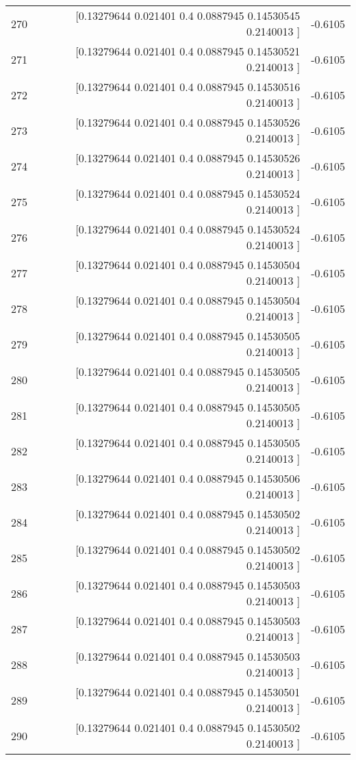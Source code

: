 \begin{longtable}{lrr}
270 & [0.13279644 0.021401   0.4        0.0887945  0.14530545 0.2140013 ] & -0.6105 \\
271 & [0.13279644 0.021401   0.4        0.0887945  0.14530521 0.2140013 ] & -0.6105 \\
272 & [0.13279644 0.021401   0.4        0.0887945  0.14530516 0.2140013 ] & -0.6105 \\
273 & [0.13279644 0.021401   0.4        0.0887945  0.14530526 0.2140013 ] & -0.6105 \\
274 & [0.13279644 0.021401   0.4        0.0887945  0.14530526 0.2140013 ] & -0.6105 \\
275 & [0.13279644 0.021401   0.4        0.0887945  0.14530524 0.2140013 ] & -0.6105 \\
276 & [0.13279644 0.021401   0.4        0.0887945  0.14530524 0.2140013 ] & -0.6105 \\
277 & [0.13279644 0.021401   0.4        0.0887945  0.14530504 0.2140013 ] & -0.6105 \\
278 & [0.13279644 0.021401   0.4        0.0887945  0.14530504 0.2140013 ] & -0.6105 \\
279 & [0.13279644 0.021401   0.4        0.0887945  0.14530505 0.2140013 ] & -0.6105 \\
280 & [0.13279644 0.021401   0.4        0.0887945  0.14530505 0.2140013 ] & -0.6105 \\
281 & [0.13279644 0.021401   0.4        0.0887945  0.14530505 0.2140013 ] & -0.6105 \\
282 & [0.13279644 0.021401   0.4        0.0887945  0.14530505 0.2140013 ] & -0.6105 \\
283 & [0.13279644 0.021401   0.4        0.0887945  0.14530506 0.2140013 ] & -0.6105 \\
284 & [0.13279644 0.021401   0.4        0.0887945  0.14530502 0.2140013 ] & -0.6105 \\
285 & [0.13279644 0.021401   0.4        0.0887945  0.14530502 0.2140013 ] & -0.6105 \\
286 & [0.13279644 0.021401   0.4        0.0887945  0.14530503 0.2140013 ] & -0.6105 \\
287 & [0.13279644 0.021401   0.4        0.0887945  0.14530503 0.2140013 ] & -0.6105 \\
288 & [0.13279644 0.021401   0.4        0.0887945  0.14530503 0.2140013 ] & -0.6105 \\
289 & [0.13279644 0.021401   0.4        0.0887945  0.14530501 0.2140013 ] & -0.6105 \\
290 & [0.13279644 0.021401   0.4        0.0887945  0.14530502 0.2140013 ] & -0.6105 \\

\end{longtable}
